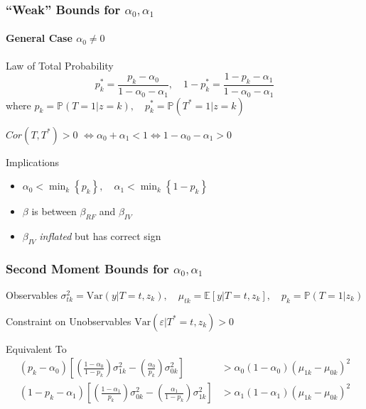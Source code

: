 \documentclass{beamer}
\begin{document}
\begin{frame}
  \frametitle{``Weak'' Bounds for $\alpha_0, \alpha_1$}
  \framesubtitle{General Case $\alpha_0 \neq 0$}

  \small

  \begin{block}{\small Law of Total Probability}
  \[
    p_k^* = \frac{p_k - \alpha_0}{1 - \alpha_0 - \alpha_1}, \quad
  1 - p_k^* = \frac{1 - p_k - \alpha_1}{1 - \alpha_0 - \alpha_1}\]
    where $p_k = \mathbb{P}(T=1|z=k), \quad p^*_k = \mathbb{P}(T^*=1|z=k)$ 
  \end{block}

  \begin{block}{\small $Cor(T,T^*)>0$}
   $\iff \alpha_0 + \alpha_1 < 1 \iff 1 - \alpha_0 - \alpha_1 > 0$ 
  \end{block}



  \begin{alertblock}{Implications}
    \vspace{-1em}
    \begin{itemize}
      \item $\alpha_0 < \min_k \left\{ p_k \right\}, \quad \alpha_1 < \min_k \left\{ 1 - p_k \right\}$
      \item $\beta$ is between $\beta_{RF}$ and $\beta_{IV}$ 
      \item $\beta_{IV}$ \emph{inflated} but has correct sign 
    \end{itemize}
  \end{alertblock}
  
\end{frame}
\begin{frame}
  \frametitle{Second Moment Bounds for $\alpha_0, \alpha_1$}
  \small

  \begin{block}{Observables}
    $\sigma^2_{tk} = \mbox{Var}(y|T=t,z_k), \quad \mu_{tk} = \mathbb{E}[y|T=t, z_k], \quad p_k = \mathbb{P}(T=1|z_k)$
  \end{block}

  \begin{block}{Constraint on Unobservables}
    $\mbox{Var}(\varepsilon|T^*=t, z_k) > 0$ 

    \begin{block}{Equivalent To}
\begin{align*}
  (p_k - \alpha_0) \left[ \left(\frac{1 - \alpha_0}{1 - p_k}\right) \sigma^2_{1k} - \left(\frac{\alpha_0}{p_k}\right) \sigma_{0k}^2 \right] &> \alpha_0 (1 - \alpha_0)(\mu_{1k} - \mu_{0k})^2\\
  (1 - p_k - \alpha_1) \left[ \left(\frac{1 - \alpha_1}{p_k}\right) \sigma^2_{0k} - \left(\frac{\alpha_1}{1-p_k}\right) \sigma_{1k}^2 \right] &> \alpha_1 (1 - \alpha_1)(\mu_{1k} - \mu_{0k})^2
\end{align*}

    \end{block} 
  \end{block}
\end{frame}
\end{document}
